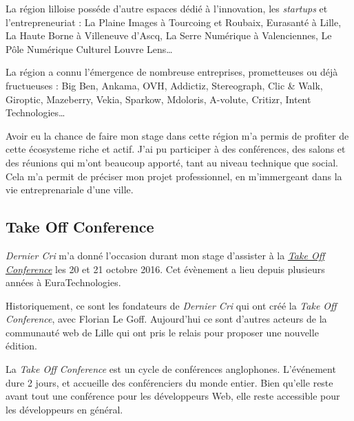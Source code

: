 \documentclass[12pt,a4paper]{article}
\begin{document}
  \bigskip

  La région lilloise posséde d'autre espaces dédié à l'innovation, les
  \emph{startups} et l'entrepreneuriat : La Plaine Images à Tourcoing et
  Roubaix, Eurasanté à Lille, La Haute Borne à Villeneuve d'Ascq, La Serre
  Numérique à Valenciennes, Le Pôle Numérique Culturel Louvre Lens\ldots{}

  \bigskip

  La région a connu l'émergence de nombreuse entreprises, prometteuses ou
  déjà fructueuses : Big Ben, Ankama, OVH, Addictiz, Stereograph, Clic \&
  Walk, Giroptic, Mazeberry, Vekia, Sparkow, Mdoloris, A-volute, Critizr,
  Intent Technologies\ldots{}

  \bigskip

  Avoir eu la chance de faire mon stage dans cette région m'a permis de
  profiter de cette écosysteme riche et actif. J'ai pu participer à des
  conférences, des salons et des réunions qui m'ont beaucoup apporté, tant
  au niveau technique que social. Cela m'a permit de préciser mon projet
  professionnel, en m'immergeant dans la vie entreprenariale d'une ville.

  \bigskip

  \subsection{Take Off Conference}\label{take-off-conference}

  \bigskip

  \emph{Dernier Cri} m'a donné l'occasion durant mon stage d'assister à la
  \href{http://takeoffconf.com/2016}{\emph{Take Off Conference}} les 20 et
  21 octobre 2016. Cet évènement a lieu depuis plusieurs années à
  EuraTechnologies.

  \bigskip

  Historiquement, ce sont les fondateurs de \emph{Dernier Cri} qui ont
  créé la \emph{Take Off Conference}, avec Florian Le Goff. Aujourd'hui ce
  sont d'autres acteurs de la communauté web de Lille qui ont pris le
  relais pour proposer une nouvelle édition.

  \bigskip

  La \emph{Take Off Conference} est un cycle de conférences anglophones.
  L'événement dure 2 jours, et accueille des conférenciers du monde
  entier. Bien qu'elle reste avant tout une conférence pour les
  développeurs Web, elle reste accessible pour les développeurs en
  général.

  \bigskip
\end{document}
